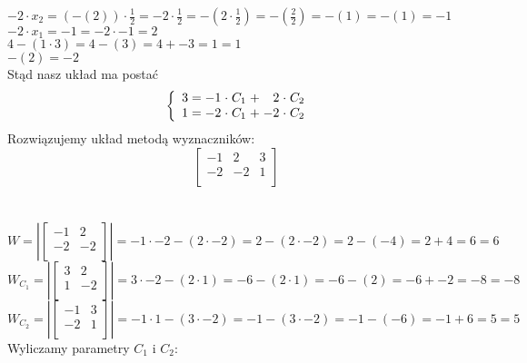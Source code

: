 \documentclass[12pt]{article}
\begin{document}
$-{2} \cdot x_2 = (- ( {2} ) )\cdot\frac{ {1} }{ {2} }  = {-2}\cdot\frac{ {1} }{ {2} }  = - ( {2}\cdot\frac{ {1} }{ {2} }  )  = - ( \frac{ {2} }{ {2} }  )  = - ( {1} )  = - ( {1} )  = {-1}$\\$-{2} \cdot x_1 = {-1} = {-2}\cdot{-1} = {2}$\\${4}- ( {1}\cdot{3} )  = {4}- ( {3} )  = {4} + {-3} = {1} = {1}$\\$- ( {2} )  = {-2}$\\Stąd nasz układ ma postać\begin{equation}\left\{\begin{array}{r@{\;=\;}r@{\;\cdot\; C_1\;+\;}r@{\;\cdot \;C_2}}{3}&{-1}&{2}\\{1} & {-2} & {-2}\\ \end{array}\right.\end{equation}Rozwiązujemy układ metodą wyznaczników:\begin{equation}\left[\begin{array}{cc|c}
{-1}&{2}&  {3}\\
{-2}&{-2}&  {1}\\
\end{array}\right] \end{equation}\\\\
$W = \left|\left[\begin{array}{cc}
{-1} & {2} \\
{-2} & {-2} \\
\end{array}\right]\right|={-1}\cdot{-2}- ( {2}\cdot{-2} ) ={2}- ( {2}\cdot{-2} ) ={2}- ( {-4} ) ={2} + {4}={6}={6}$\\$W_{C_1} = \left|\left[\begin{array}{cc}
{3} & {2} \\
{1} & {-2} \\
\end{array}\right]\right|={3}\cdot{-2}- ( {2}\cdot{1} ) ={-6}- ( {2}\cdot{1} ) ={-6}- ( {2} ) ={-6} + {-2}={-8}={-8}$\\$W_{C_2} = \left|\left[\begin{array}{cc}
{-1} & {3} \\
{-2} & {1} \\
\end{array}\right]\right|={-1}\cdot{1}- ( {3}\cdot{-2} ) ={-1}- ( {3}\cdot{-2} ) ={-1}- ( {-6} ) ={-1} + {6}={5}={5}$\\Wyliczamy parametry $C_1$ i $C_2$:
\end{document}
